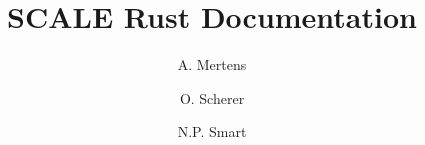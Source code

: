 \documentclass{article}
\begin{document}
\newcommand{\mainsection}[1]{\newpage \section{#1}}
\newcommand{\msubsection}[1]{\newpage \subsection{#1}}
\newcommand{\msubsubsection}[1]{\subsubsection{#1}}

\title{SCALE Rust Documentation}
\author{
A. Mertens
\and O. Scherer
\and N.P. Smart}

\maketitle

\tableofcontents















\end{document}
